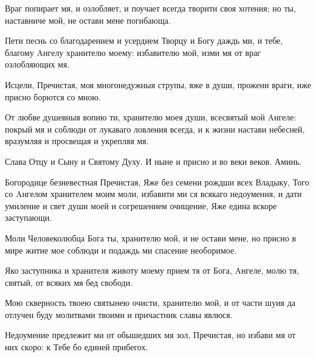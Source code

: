 \begin{mymulticols}

Враг попирает мя, и озлобляет, и поучает всегда творити своя хотения; но ты, наставниче мой, не остави мене погибающа.

\slava

Пети песнь со благодарением и усердием Творцу и Богу даждь ми, и тебе, благому Aнгелу хранителю моему: избавителю мой, изми мя от враг озлобляющих мя.

\inyne

Исцели, Пречистая, моя многонедужныя струпы, яже в души, прожени враги, иже присно борются со мною.


От любве душевныя вопию ти, хранителю моея души, всесвятый мой Aнгеле: покрый мя и соблюди от лукаваго ловления всегда, и к жизни настави небесней, вразумляя и просвещая и укрепляя мя.

Слава Отцу и Сыну и Святому Духу. И ныне и присно и во веки веков. Аминь.


Богородице безневестная Пречистая, Яже без семени рождши всех Владыку, Того со Aнгелом хранителем моим моли, избавити ми ся всякаго недоумения, и дати умиление и свет души моей и согрешением очищение, Яже едина вскоре заступающи.




Моли Человеколюбца Бога ты, хранителю мой, и не остави мене, но присно в мире житие мое соблюди и подаждь ми спасение необоримое.


Яко заступника и хранителя животу моему прием тя от Бога, Aнгеле, молю тя, святый, от всяких мя бед свободи.

\slava

Мою скверность твоею святынею очисти, хранителю мой, и от части шуия да отлучен буду молитвами твоими и причастник славы явлюся.

\inyne

Недоумение предлежит ми от обышедших мя зол, Пречистая, но избави мя от них скоро: к Тебе бо единей прибегох.



\end{mymulticols}
